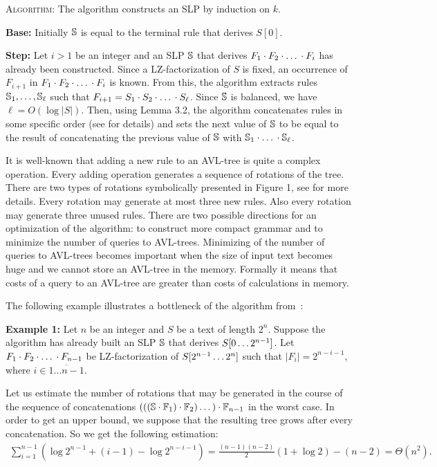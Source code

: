 \documentclass[10pt]{article}
\begin{document}
\noindent \textsc{Algorithm:} The algorithm constructs an SLP by induction on $k$.

\textbf{Base:} Initially $\mathbb{S}$ is equal to the terminal rule that derives $S[0]$.

\textbf{Step:} Let $i > 1$ be an integer and an SLP $\mathbb{S}$ that derives $F_1 \cdot F_2 \cdot \mbox{\dots} \cdot F_i$
has already been constructed. Since a LZ-factorization of $S$ is fixed, an occurrence of $F_{i+1}$ in $F_1\cdot F_2
\cdot \mbox{\dots} \cdot F_i$ is known. From this, the algorithm extracts rules $\mathbb{S}_1, \dots, \mathbb{S}_\ell$ such
that $F_{i+1} = S_1 \cdot S_2 \cdot \mbox{\dots} \cdot S_\ell$. Since $\mathbb{S}$ is balanced, we have $\ell = O(\log
|S|)$. Then, using Lemma 3.2, the algorithm concatenates rules in some specific order (see \cite{SLPConstruction} for
details) and sets the next value of $\mathbb{S}$ to be equal to the result of concatenating the previous value of
$\mathbb{S}$ with $\mathbb{S}_1 \cdot \mbox{\dots} \cdot \mathbb{S}_\ell$.

\begin{center}
	\AVLrotations
\end{center}

It is well-known that adding a new rule to an AVL-tree is quite a complex operation. Every adding operation generates a
sequence of rotations of the tree. There are two types of rotations symbolically presented in Figure 1, see
\cite{SLPConstruction} for more details. Every rotation may generate at most three new rules. Also every rotation may
generate three unused rules. There are two possible directions for an optimization of the algorithm: to construct more
compact grammar and to minimize the number of queries to AVL-trees. Minimizing of the number of queries to AVL-trees
becomes important when the size of input text becomes huge and we cannot store an AVL-tree in the memory. Formally it
means that costs of a query to an AVL-tree are greater than costs of calculations in memory.

The following example illustrates a bottleneck of the algorithm from~\cite{SLPConstruction}:

\noindent \textbf{Example 1:} Let $n$ be an integer and $S$ be a text of length $2^n$. Suppose the algorithm has already
built an SLP $\mathbb{S}$ that derives $S[0\dots2^{n-1}]$. Let $F_1 \cdot F_2 \cdot \mbox{\dots} \cdot F_{n-1}$ be
LZ-factorization of $S[2^{n-1}\dots2^n]$ such that $|F_i| = 2^{n-i-1}$, where $i \in \overline{1\dots n-1}$.

Let us estimate the number of rotations that may be generated in the course of the sequence of concatenations
$(((\mathbb{S} \cdot \mathbb{F}_1)\cdot \mathbb{F}_2)\dots) \cdot \mathbb{F}_{n-1}$ in the worst case. In order to get an
upper bound, we suppose that the resulting tree grows after every concatenation. So we get the following estimation:
\begin{multline*} 
\sum_{i=1}^{n-1} (\log{2^{n-1}} + (i-1) - \log{2^{n-i-1}}) = \frac{(n-1)(n-2)}{2}(1 + \log{2}) - (n-2) = \Theta(n^2).
\end{multline*}
\end{document}
